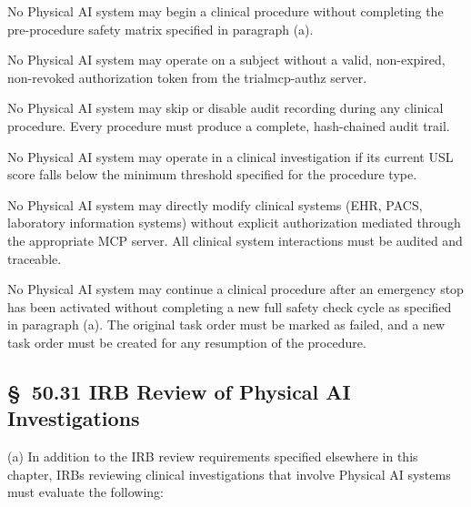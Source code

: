 \begin{description}[leftmargin=1.0cm,style=sameline]
\item[(1)] No Physical AI system may begin a clinical procedure without completing the pre-procedure safety matrix specified in paragraph (a).
\item[(2)] No Physical AI system may operate on a subject without a valid, non-expired, non-revoked authorization token from the trialmcp-authz server.
\item[(3)] No Physical AI system may skip or disable audit recording during any clinical procedure. Every procedure must produce a complete, hash-chained audit trail.
\item[(4)] No Physical AI system may operate in a clinical investigation if its current USL score falls below the minimum threshold specified for the procedure type.
\item[(5)] No Physical AI system may directly modify clinical systems (EHR, PACS, laboratory information systems) without explicit authorization mediated through the appropriate MCP server. All clinical system interactions must be audited and traceable.
\item[(6)] No Physical AI system may continue a clinical procedure after an emergency stop has been activated without completing a new full safety check cycle as specified in paragraph (a). The original task order must be marked as failed, and a new task order must be created for any resumption of the procedure.
\end{description}

\subsection{\S~50.31 IRB Review of Physical AI Investigations}

(a) In addition to the IRB review requirements specified elsewhere in this chapter, IRBs reviewing clinical investigations that involve Physical AI systems must evaluate the following:

